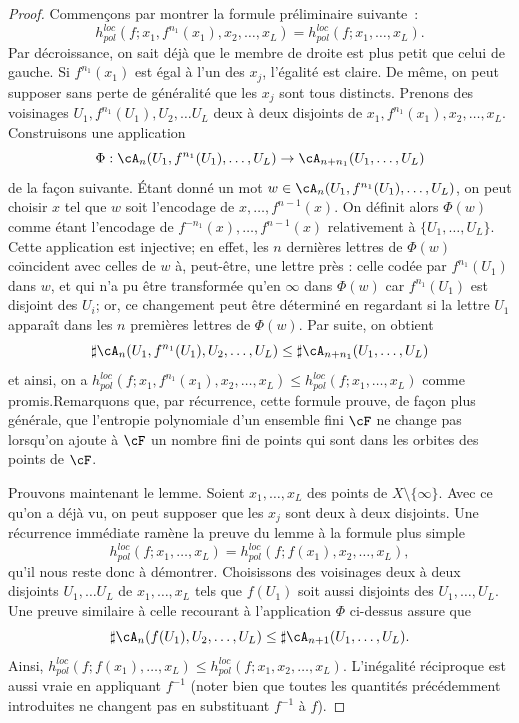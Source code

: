 \begin{proof}
Commençons par montrer la formule préliminaire suivante~:
\[
h^{loc}_{pol}(f;x_1, f^{n_1}(x_{1}), x_2, \dots, x_{L}) = h^{loc}_{pol}(f;x_{1}, \dots, x_{L}).
\]
Par décroissance, on sait déjà que le membre de droite est plus petit que celui de gauche. Si $f^{n_1}(x_1)$ est égal à l'un des $x_j$, l'égalité est claire. De même, on peut supposer sans perte de généralité que les $x_j$ sont tous distincts. Prenons des voisinages $U_1, f^{n_1}(U_1), U_2, \dots U_L$ deux à deux disjoints de $x_1, f^{n_1}(x_{1}), x_2, \dots, x_{L}$. Construisons une application
\[
\Phi: \cA_{n}(U_1, f^{n_1}(U_1), \dots, U_L) \to \cA_{n+n_1}(U_1, \dots, U_L)
\]
de la façon suivante. \'Etant donné un mot $w \in \cA_{n}(U_1, f^{n_1}(U_1), \dots, U_L)$, on peut choisir $x$ tel que $w$ soit l'encodage de $x, \dots, f^{n-1}(x)$. On définit alors $\Phi(w)$ comme étant l'encodage de $f^{-n_1}(x), \dots, f^{n-1}(x)$ relativement à $\{U_1, \dots, U_L\}$. Cette application est injective; en effet, les $n$ dernières lettres de $\Phi(w)$ co\"{\i}ncident avec celles de $w$ à, peut-être, une lettre près : celle codée par $f^{n_1}(U_1)$ dans $w$, et qui {n'a pu être transformée qu'en $\infty$ dans $\Phi(w)$ car $f^{n_1}(U_1)$ est disjoint des $U_i$}; or, ce changement peut être déterminé en regardant si la lettre $U_1$ apparaît dans les $n$ premières lettres de $\Phi(w)$. Par suite, on obtient
\[
\sharp \cA_{n}(U_1, f^{n_1}(U_1), U_2, \dots, U_L) \leq \sharp \cA_{n+n_1}(U_1, \dots, U_L)
\]
et ainsi, on a $h^{loc}_{pol}(f;x_1, f^{n_1}(x_{1}), x_2, \dots, x_{L}) \leq h^{loc}_{pol}(f;x_{1}, \dots, x_{L})$ comme promis.\linebreak Remarquons que, par récurrence, cette formule prouve, de façon plus générale, que l'entropie polynomiale d'un ensemble fini $\cF$ ne change pas lorsqu'on ajoute à $\cF$ un nombre fini de points qui sont dans les orbites des points de $\cF$.

Prouvons maintenant le lemme. Soient $x_1, \dots, x_L$ des points de $X \setminus \{\infty\}$. Avec ce qu'on a déjà vu, on peut supposer que les $x_j$ sont deux à deux disjoints. Une récurrence immédiate ramène la preuve du lemme à la formule plus simple
\[
h^{loc}_{pol}(f;x_{1}, \dots, x_{L})=h^{loc}_{pol}(f;f(x_{1}), x_2, \dots, x_{L}),
\]
{qu'il nous reste donc à démontrer}. Choisissons des voisinages deux à deux disjoints $U_1, \dots U_L$ de $x_1, \dots, x_{L}$ tels que $f(U_1)$ soit aussi disjoints des $U_1, \dots, U_L$. Une preuve similaire à celle recourant
à l'application $\Phi$ ci-dessus assure que
\[
\sharp \cA_{n}(f(U_1), U_2, \dots, U_L) \leq \sharp \cA_{n+1}(U_1, \dots, U_L).
\]
Ainsi, $h^{loc}_{pol}(f;f(x_{1}), \dots, x_{L}) \leq h^{loc}_{pol}(f;x_{1}, x_2, \dots, x_{L})$. L'inégalité réciproque est aussi vraie en appliquant $f^{-1}$ (noter bien que toutes les quantités précédemment introduites ne changent pas en substituant $f^{-1}$ à $f$).
\end{proof}

